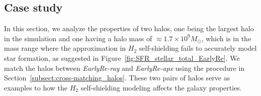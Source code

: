 \documentclass[linenumbers, twocolumn]{aastex631}
\begin{document}


\subsection{Case study}
\label{subsect:case_study}

In this section, we analyze the properties of two halos, one being the largest halo in the simulation and one having a halo mass of $\approx 1.7\times 10^{9} M_\odot$, which is in the mass range where the approximation in $H_{2}$ self-shielding fails to accurately model star formation, as suggested in Figure~\ref{fig:SFR_stellar_total_EarlyRe}. We match the halos between \textit{EarlyRe-ray} and \textit{EarlyRe-apx} using the procedure in Section~\ref{subsect:cross-matching_halos}. These two pairs of halos serve as examples to how the $H_{2}$ self-shielding modeling affects the galaxy properties. 
\end{document}
